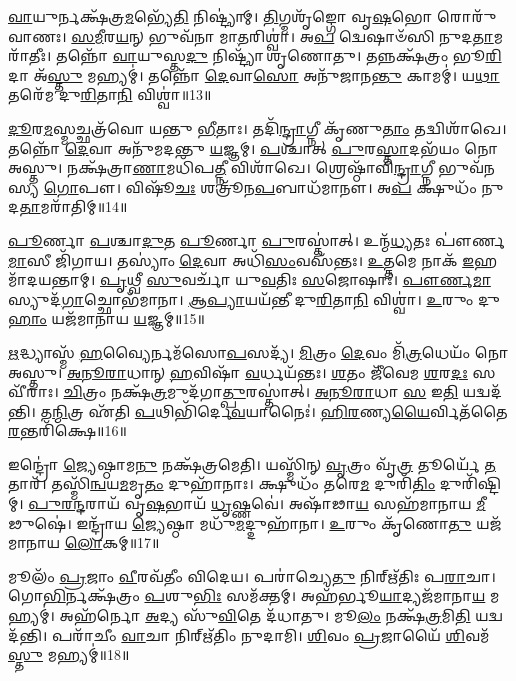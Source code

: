 \-\ul{𑌵𑌾}\-𑌯𑍁𑌰𑍍𑌨𑌕𑍍𑌷᳴𑌤𑍍𑌰\-\ul{𑌮}\-𑌭𑍍𑌯𑍇᳴\-\ul{𑌤𑌿} 𑌨𑌿𑌷𑍍𑌟𑍍𑌯𑌾॑𑌮𑍍। 
\-\ul{𑌤𑌿}\-𑌗𑍍𑌮𑌶𑍃᳴𑌙𑍍𑌗𑍋 𑌵𑍃\-\ul{𑌷}\-𑌭𑍋 𑌰𑍋𑌰𑍁᳴𑌵𑌾𑌣𑌃। 
\-\ul{𑌸}\-\-\ul{𑌮𑍀}\-𑌰\-\ul{𑌯}\-𑌨𑍍 𑌭𑍁𑌵᳴𑌨𑌾 𑌮𑌾\-\ul{𑌤}\-𑌰𑌿𑌶𑍍𑌵𑌾॑। 
𑌅\-\ul{𑌪} 𑌦𑍍𑌵𑍇𑌷𑌾𑍞᳴𑌸𑌿 𑌨𑍁𑌦\-\ul{𑌤𑌾}\-𑌮𑌰𑌾᳴𑌤𑍀𑌃। 
𑌤𑌨𑍍𑌨𑍋᳴ \ul{𑌵𑌾}\-𑌯𑍁𑌸𑍍𑌤\-\ul{𑌦𑍁} 𑌨𑌿𑌷𑍍𑌟𑍍𑌯𑌾᳴ 𑌶𑍃𑌣𑍋𑌤𑍁। 
𑌤𑌨𑍍𑌨𑌕𑍍𑌷᳴𑌤𑍍𑌰𑌂 𑌭𑍂\-\ul{𑌰𑌿}\-𑌦𑌾 𑌅᳴\-\ul{𑌸𑍍𑌤𑍁} 𑌮𑌹𑍍𑌯𑌮𑍍॑। 
𑌤𑌨𑍍𑌨𑍋᳴ \ul{𑌦𑍇}\-𑌵𑌾\-\ul{𑌸𑍋} 𑌅𑌨𑍁᳴𑌜𑌾𑌨\-\ul{𑌨𑍍𑌤𑍁} 𑌕𑌾𑌮𑌮𑍍॑। 
𑌯\-\ul{𑌥𑌾} 𑌤𑌰𑍇᳴𑌮 𑌦𑍁\-\ul{𑌰𑌿}\-𑌤𑌾\-\ul{𑌨𑌿} 𑌵𑌿𑌶𑍍𑌵𑌾॑॥13॥ 

\-\ul{𑌦𑍂}\-𑌰\-\ul{𑌮}\-𑌸𑍍𑌮𑌚𑍍𑌛𑌤𑍍𑌰᳴𑌵𑍋 𑌯𑌨𑍍𑌤𑍁 \ul{𑌭𑍀}\-𑌤𑌾𑌃। 
𑌤𑌦𑌿᳴\-\ul{𑌨𑍍𑌦𑍍𑌰𑌾}\-𑌗𑍍𑌨𑍀 𑌕𑍃᳴𑌣𑍁\-\ul{𑌤𑌾𑌂} 𑌤𑌦𑍍𑌵𑌿𑌶𑌾᳴𑌖𑍇। 
𑌤𑌨𑍍𑌨𑍋᳴ \ul{𑌦𑍇}\-𑌵𑌾 𑌅𑌨𑍁᳴𑌮𑌦𑌨𑍍𑌤𑍁 \ul{𑌯}\-𑌜𑍍𑌞𑌮𑍍। 
\-\ul{𑌪}\-𑌶𑍍𑌚𑌾𑌤𑍍 \ul{𑌪𑍁}\-𑌰\-\ul{𑌸𑍍𑌤𑌾}\-𑌦𑌭᳴𑌯𑌂 𑌨𑍋 𑌅𑌸𑍍𑌤𑍁। 
𑌨𑌕𑍍𑌷᳴𑌤𑍍𑌰𑌾\-\ul{𑌣𑌾}\-𑌮𑌧𑌿᳴𑌪\-\ul{𑌤𑍍𑌨𑍀} 𑌵𑌿𑌶𑌾᳴𑌖𑍇। 
𑌶𑍍𑌰𑍇𑌷𑍍𑌠𑌾᳴𑌵𑌿\-\ul{𑌨𑍍𑌦𑍍𑌰𑌾}\-𑌗𑍍𑌨𑍀 𑌭𑍁𑌵᳴𑌨𑌸𑍍𑌯 \ul{𑌗𑍋}\-𑌪𑍗। 
𑌵𑌿𑌷𑍂᳴\-\ul{𑌚𑌃} 𑌶𑌤𑍍𑌰𑍂᳴𑌨\-\ul{𑌪}\-𑌬𑌾𑌧᳴𑌮𑌾𑌨𑍗। 
𑌅\-\ul{𑌪} 𑌕𑍍𑌷𑍁𑌧𑌂᳴ 𑌨𑍁𑌦\-\ul{𑌤𑌾}\-𑌮𑌰𑌾᳴𑌤𑌿𑌮𑍍॥14॥ 

\-\ul{𑌪𑍂}\-𑌰𑍍𑌣𑌾 \ul{𑌪}\-𑌶𑍍𑌚𑌾\-\ul{𑌦𑍁}\-𑌤 \ul{𑌪𑍂}\-𑌰𑍍𑌣𑌾 \ul{𑌪𑍁}\-𑌰𑌸𑍍𑌤𑌾॑𑌤𑍍। 
𑌉𑌨𑍍𑌮᳴\-\ul{𑌧𑍍𑌯}\-𑌤𑌃 𑌪𑍗॑𑌰𑍍𑌣\-\ul{𑌮𑌾}\-𑌸𑍀 𑌜𑌿᳴𑌗𑌾𑌯। 
𑌤𑌸𑍍𑌯𑌾𑌂॑ \ul{𑌦𑍇}\-𑌵𑌾 𑌅𑌧𑌿᳴\-\ul{𑌸𑌂}\-𑌵𑌸᳴𑌨𑍍𑌤𑌃। 
\-\ul{𑌉}\-\-\ul{𑌤𑍍𑌤}\-𑌮𑍇 𑌨𑌾𑌕᳴ \ul{𑌇}\-𑌹 𑌮𑌾᳴𑌦𑌯𑌨𑍍𑌤𑌾𑌮𑍍। 
\-\ul{𑌪𑍃}\-𑌥𑍍𑌵𑍀 \ul{𑌸𑍁}\-𑌵𑌰𑍍𑌚𑌾᳴ 𑌯𑍁\-\ul{𑌵}\-𑌤𑌿𑌃 \ul{𑌸}\-𑌜𑍋𑌷𑌾𑌃॑। 
\-\ul{𑌪𑍗}\-\-\ul{𑌰𑍍𑌣}\-\-\ul{𑌮𑌾}\-𑌸𑍍𑌯𑍁𑌦᳴\-\ul{𑌗𑌾}\-𑌚𑍍𑌛𑍋𑌭᳴𑌮𑌾𑌨𑌾। 
\-\ul{𑌆}\-\-\ul{𑌪𑍍𑌯𑌾}\-𑌯𑌯᳴𑌨𑍍𑌤𑍀 𑌦𑍁\-\ul{𑌰𑌿}\-𑌤𑌾\-\ul{𑌨𑌿} 𑌵𑌿𑌶𑍍𑌵𑌾॑। 
\-\ul{𑌉}\-𑌰𑍁𑌂 𑌦𑍁\-\ul{𑌹𑌾𑌂} 𑌯𑌜᳴𑌮𑌾𑌨𑌾𑌯 \ul{𑌯}\-𑌜𑍍𑌞𑌮𑍍॥15॥ 

\-\ul{𑌋}\-𑌦𑍍𑌧𑍍𑌯𑌾𑌸𑍍𑌮᳴ \ul{𑌹}\-𑌵𑍍𑌯𑍈𑌰𑍍𑌨𑌮᳴𑌸𑍋\-\ul{𑌪}\-𑌸𑌦𑍍𑌯᳴। 
\-\ul{𑌮𑌿}\-𑌤𑍍𑌰𑌂 \ul{𑌦𑍇}\-𑌵𑌂 𑌮𑌿᳴\-\ul{𑌤𑍍𑌰}\-𑌧𑍇𑌯𑌂᳴ 𑌨𑍋 𑌅𑌸𑍍𑌤𑍁। 
\-\ul{𑌅}\-\-\ul{𑌨𑍂}\-\-\ul{𑌰𑌾}\-𑌧𑌾𑌨𑍍 \ul{𑌹}\-𑌵𑌿𑌷𑌾᳴ \ul{𑌵}\-𑌰𑍍𑌧𑌯᳴𑌨𑍍𑌤𑌃। 
\-\ul{𑌶}\-𑌤𑌂 𑌜𑍀᳴𑌵𑍇𑌮 \ul{𑌶}\-𑌰\-\ul{𑌦𑌃} 𑌸𑌵𑍀᳴𑌰𑌾𑌃। 
\-\ul{𑌚𑌿}\-𑌤𑍍𑌰𑌂 𑌨𑌕𑍍𑌷᳴\-\ul{𑌤𑍍𑌰}\-𑌮𑍁𑌦᳴𑌗𑌾\-\ul{𑌤𑍍𑌪𑍁}\-𑌰𑌸𑍍𑌤𑌾॑𑌤𑍍। 
\-\ul{𑌅}\-\-\ul{𑌨𑍂}\-\-\ul{𑌰𑌾}\-𑌧𑌾 \ul{𑌸} 𑌇\-\ul{𑌤𑌿} 𑌯𑌦𑍍𑌵𑌦᳴𑌨𑍍𑌤𑌿। 
𑌤\-\ul{𑌨𑍍𑌮𑌿}\-𑌤𑍍𑌰 𑌏᳴𑌤𑌿 \ul{𑌪}\-𑌥𑌿𑌭𑌿᳴𑌰𑍍𑌦𑍇\-\ul{𑌵}\-𑌯𑌾𑌨𑍈𑌃॑। 
\-\ul{𑌹𑌿}\-\-\ul{𑌰}\-𑌣𑍍𑌯\-\ul{𑌯𑍈}\-𑌰𑍍𑌵𑌿𑌤᳴𑌤𑍈\-\-\ul{𑌰}\-𑌨𑍍𑌤𑌰𑌿᳴𑌕𑍍𑌷𑍇॥16॥ 

𑌇𑌨𑍍𑌦𑍍𑌰𑍋॑ \ul{𑌜𑍍𑌯𑍇}\-𑌷𑍍𑌠𑌾𑌮\-\ul{𑌨𑍁} 𑌨𑌕𑍍𑌷᳴𑌤𑍍𑌰𑌮𑍇𑌤𑌿। 
𑌯𑌸𑍍𑌮𑌿᳴𑌨𑍍 \ul{𑌵𑍃}\-𑌤𑍍𑌰𑌂 𑌵𑍃᳴\-\ul{𑌤𑍍𑌰} 𑌤𑍂𑌰𑍍𑌯𑍇᳴ \ul{𑌤}\-𑌤𑌾𑌰᳴। 
𑌤𑌸𑍍𑌮𑌿᳴\-\ul{𑌨𑍍𑌵}\-𑌯\-\ul{𑌮}\-𑌮𑍃\-\ul{𑌤𑌂} 𑌦𑍁𑌹𑌾᳴𑌨𑌾𑌃। 
𑌕𑍍𑌷𑍁𑌧𑌂᳴ 𑌤𑌰𑍇\-\ul{𑌮} 𑌦𑍁𑌰𑌿᳴\-\ul{𑌤𑌿𑌂} 𑌦𑍁𑌰𑌿᳴𑌷𑍍𑌟𑌿𑌮𑍍। 
\-\ul{𑌪𑍁}\-\-\ul{𑌰}\-\-\ul{𑌨𑍍𑌦}\-𑌰𑌾𑌯᳴ 𑌵𑍃\-\ul{𑌷}\-𑌭𑌾𑌯᳴ \ul{𑌧𑍃}\-𑌷𑍍𑌣𑌵𑍇॑। 
𑌅𑌷𑌾᳴𑌢𑌾\-\ul{𑌯} 𑌸𑌹᳴𑌮𑌾𑌨𑌾𑌯 \ul{𑌮𑍀}\-𑌢𑍁𑌷𑍇॑। 
𑌇𑌨𑍍𑌦𑍍𑌰𑌾᳴𑌯 \ul{𑌜𑍍𑌯𑍇}\-𑌷𑍍𑌠𑌾 𑌮𑌧𑍁᳴\-\ul{𑌮}\-𑌦𑍍𑌦𑍁𑌹𑌾᳴𑌨𑌾। 
\-\ul{𑌉}\-𑌰𑍁𑌂 𑌕𑍃᳴𑌣𑍋\-\ul{𑌤𑍁} 𑌯𑌜᳴𑌮𑌾𑌨𑌾𑌯 \ul{𑌲𑍋}\-𑌕𑌮𑍍॥17॥ 

𑌮𑍂𑌲𑌂᳴ \ul{𑌪𑍍𑌰}\-𑌜𑌾𑌂 \ul{𑌵𑍀}\-𑌰𑌵᳴𑌤𑍀𑌂 𑌵𑌿𑌦𑍇𑌯। 
𑌪𑌰𑌾॑𑌚𑍍𑌯𑍇\-\ul{𑌤𑍁} 𑌨𑌿𑌰𑍍𑌋᳴𑌤𑌿𑌃 𑌪\-\ul{𑌰𑌾}\-𑌚𑌾। 
𑌗𑍋\-\ul{𑌭𑌿}\-𑌰𑍍𑌨𑌕𑍍𑌷᳴𑌤𑍍𑌰𑌂 \ul{𑌪}\-𑌶𑍁\-\ul{𑌭𑌿𑌃} 𑌸𑌮᳴𑌕𑍍𑌤𑌮𑍍। 
𑌅𑌹᳴𑌰𑍍𑌭𑍂\-\ul{𑌯𑌾}\-𑌦𑍍𑌯𑌜᳴𑌮𑌾𑌨𑌾\-\ul{𑌯} 𑌮𑌹𑍍𑌯𑌮𑍍॑। 
𑌅𑌹᳴𑌰𑍍𑌨𑍋 \ul{𑌅}\-𑌦𑍍𑌯 𑌸𑍁᳴\-\ul{𑌵𑌿}\-𑌤𑍇 𑌦᳴𑌧𑌾𑌤𑍁। 
𑌮𑍂\-\ul{𑌲𑌂} 𑌨𑌕𑍍𑌷᳴\-\ul{𑌤𑍍𑌰}\-𑌮𑌿\-\ul{𑌤𑌿} 𑌯𑌦𑍍𑌵𑌦᳴𑌨𑍍𑌤𑌿। 
𑌪𑌰𑌾᳴𑌚𑍀𑌂 \ul{𑌵𑌾}\-𑌚𑌾 𑌨𑌿𑌰𑍍𑌋᳴𑌤𑌿𑌂 𑌨𑍁𑌦𑌾𑌮𑌿। 
\-\ul{𑌶𑌿}\-𑌵𑌂 \ul{𑌪𑍍𑌰}\-𑌜𑌾𑌯𑍈᳴ \ul{𑌶𑌿}\-𑌵𑌮᳴\-\ul{𑌸𑍍𑌤𑍁} 𑌮𑌹𑍍𑌯𑌮𑍍॑॥18॥ 

